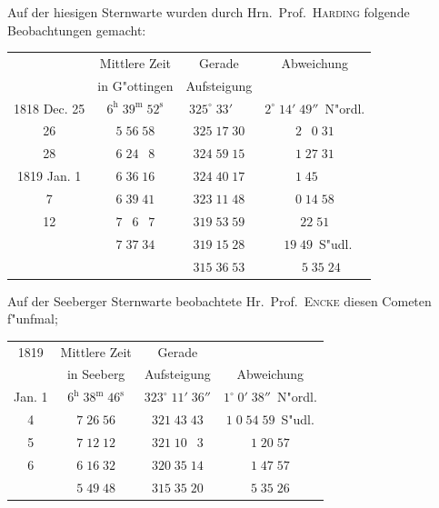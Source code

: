\documentclass[12pt,a4paper]{article}
\begin{document}
Auf der hiesigen Sternwarte wurden durch Hrn.~Prof.~\textsc{Harding} folgende Beobachtungen gemacht:

\begin{center}
\small
\begin{tabular}{c|c|c|c}
\toprule
& Mittlere Zeit & Gerade & Abweichung \\
& in G"ottingen & Aufsteigung & \\
\midrule
1818 Dec. 25 & $6^{\mathrm{h}}\;39^{\mathrm{m}}\;52^{\mathrm{s}}$ & $325^{\circ}\;33'\;\phantom{0}\phantom{0}$ & $2^{\circ}\;14'\;49''$~N"ordl. \\
\phantom{25} 26 & $5\;56\;58$ & $325\;17\;30$ & $2\;\phantom{0}0\;31$ \\
\phantom{25} 28 & $6\;24\;\phantom{0}8$ & $324\;59\;15$ & $1\;27\;31$ \\
1819 Jan. \phantom{0}1 & $6\;36\;16$ & $324\;40\;17$ & $1\;45\;\phantom{0}\phantom{0}$ \\
\phantom{0}\phantom{0} \phantom{0}7 & $6\;39\;41$ & $323\;11\;48$ & $0\;14\;58$ \\
\phantom{0}\phantom{0} 12 & $7\;\phantom{0}6\;\phantom{0}7$ & $319\;53\;59$ & \phantom{0}\phantom{0}$22\;51$ \\
\phantom{0}\phantom{0} & $7\;37\;34$ & $319\;15\;28$ & \phantom{0}$\phantom{0}19\;49$~S"udl. \\
\phantom{0}\phantom{0} & & $315\;36\;53$ & \phantom{0}$\phantom{0}\phantom{0}5\;35\;24$ \\
\bottomrule
\end{tabular}
\end{center}

Auf der Seeberger Sternwarte beobachtete Hr.~Prof.~\textsc{Encke} diesen Cometen f"unfmal;

\begin{center}
\small
\begin{tabular}{c|c|c|c}
\toprule
1819 & Mittlere Zeit & Gerade & \\
& in Seeberg & Aufsteigung & Abweichung \\
\midrule
Jan. \phantom{0}1 & $6^{\mathrm{h}}\;38^{\mathrm{m}}\;46^{\mathrm{s}}$ & $323^{\circ}\;11'\;36''$ & $1^{\circ}\;0'\;38''$~N"ordl. \\
\phantom{0}\phantom{0} \phantom{0}4 & $7\;26\;56$ & $321\;43\;43$ & $1\;0\;54\;59$~S"udl. \\
\phantom{0}\phantom{0} \phantom{0}5 & $7\;12\;12$ & $321\;10\;\phantom{0}3$ & $1\;20\;57$ \\
\phantom{0}\phantom{0} \phantom{0}6 & $6\;16\;32$ & $320\;35\;14$ & $1\;47\;57$ \\
\phantom{0}\phantom{0} & $5\;49\;48$ & $315\;35\;20$ & $5\;35\;26$ \\
\bottomrule
\end{tabular}
\end{center}
\end{document}
